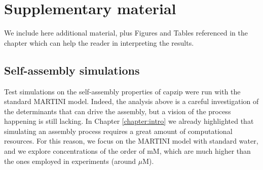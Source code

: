 \section{Supplementary material} \label{sec:ch3_SI}

We include here additional material, plus Figures and Tables referenced in the chapter which can help the reader in interpreting the results.

\subsection{Self-assembly simulations}
Test simulations on the self-assembly properties of capzip were run with the standard MARTINI model. Indeed, the analysis above is a careful investigation of the determinants that can drive the assembly, but a vision of the process happening is still lacking.
%
In Chapter \ref{chapter:intro} we already highlighted that simulating an assembly process requires a great amount of computational resources. For this reason, we focus on the MARTINI model with standard water, and we explore concentrations of the order of mM, which are much higher than the ones employed in experiments (around $\mu$M).

